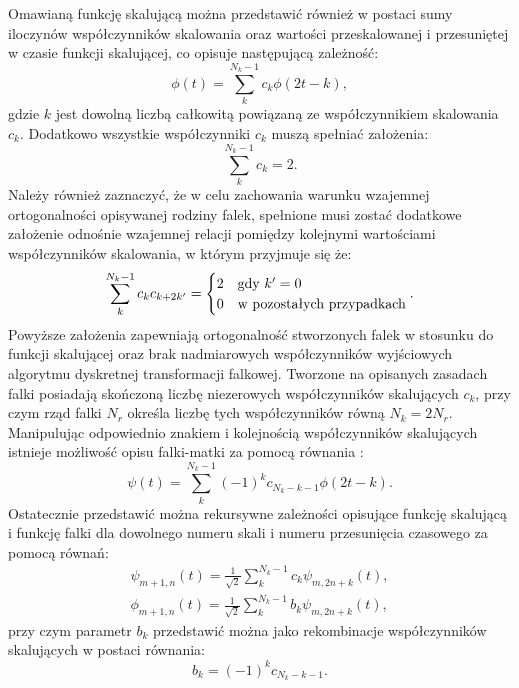 Omawianą funkcję skalującą można przedstawić również w postaci sumy iloczynów współczynników skalowania oraz wartości przeskalowanej i przesuniętej w czasie funkcji skalującej, co opisuje następującą zależność:
\begin{equation}
\phi \left( t \right) = \sum _{k} ^{N_k-1} c_{k} \phi \left( 2t - k \right) \label{eqn_dwt_scalefunrek},
\end{equation}
gdzie $k$ jest dowolną liczbą całkowitą powiązaną ze współczynnikiem skalowania $c_k$. Dodatkowo wszystkie współczynniki $c_k$ muszą spełniać założenia:
\begin{equation}
\sum _{k} ^{N_k-1} c_{k} = 2 \label{eqn_dwt_scalefunsum}.
\end{equation}
Należy również zaznaczyć, że w celu zachowania warunku wzajemnej ortogonalności opisywanej rodziny falek, spełnione musi zostać dodatkowe założenie odnośnie wzajemnej relacji pomiędzy kolejnymi wartościami współczynników skalowania, w którym przyjmuje się że:
\begin{equation}
\sum _{k} ^{N_k-1} c_{k} c_{k+2k'} =
\begin{cases}
	2 & $gdy$ ~ k' = 0 \\
	0 & $w pozostałych przypadkach$
\end{cases}
\label{eqn_dwt_scalemulort}.
\end{equation}
Powyższe założenia zapewniają ortogonalność stworzonych falek w stosunku do funkcji skalującej oraz brak nadmiarowych współczynników wyjściowych algorytmu dyskretnej transformacji falkowej. Tworzone na opisanych zasadach falki posiadają skończoną liczbę niezerowych współczynników skalujących $c_k$, przy czym rząd falki $N_r$ określa liczbę tych współczynników równą $N_{k} = 2 N_r$. Manipulując odpowiednio znakiem i kolejnością współczynników skalujących istnieje możliwość opisu falki-matki za pomocą równania \cite{wallen_handbook}:
\begin{equation}
\psi \left( t \right) = \sum _{k} ^{N_k-1} \left( -1 \right) ^{k} c_{N_k-k-1} \phi \left( 2t - k \right) \label{eqn_dwt_waveletfunrek}.
\end{equation}
Ostatecznie przedstawić można rekursywne zależności opisujące funkcję skalującą i funkcję falki dla dowolnego numeru skali i numeru przesunięcia czasowego za pomocą równań:
\begin{gather}
\psi_{m+1,n} \left( t \right) = \frac{1}{\sqrt{2}} \sum _{k} ^{N_k-1} c_{k} \psi_{m,2n+k} \left( t \right) \label{eqn_dwt_fatherrek}, \\
\phi_{m+1,n} \left( t \right) = \frac{1}{\sqrt{2}} \sum _{k} ^{N_k-1} b_{k} \psi_{m,2n+k} \left( t \right) \label{eqn_dwt_matherrek},
\end{gather}
przy czym parametr $b_{k}$ przedstawić można jako rekombinacje współczynników skalujących w postaci równania:
\begin{equation}
b_{k} = \left( -1 \right) ^{k} c_{N_k-k-1} \label{eqn_dwt_bk}.
\end{equation}

